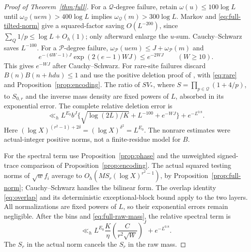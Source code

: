\documentclass[11pt]{article}
\theoremstyle{definition}
\newcommand{\Pset}{\mathcal P}
\theoremstyle{remark}
\numberwithin{equation}{section}
\newcommand{\Qset}{\mathcal Q}
\begin{document}
\begin{proof}[Proof of Theorem~\ref{thm:full}]
For a $\Qset$-degree failure, retain $\omega(u)\le100\log L$ until
$\omega_{\Qset}(uem)>400\log L$ implies $\omega_{\Qset}(m)>300\log L$.
Markov and \eqref{eq:full-tilted-norm} give a squared-factor saving $O(L^{-200})$, since
$\sum_Q1/p\le\log L+O_h(1)$; only afterward enlarge the $u$-sum.
Cauchy--Schwarz saves $L^{-100}$.
For a $\Pset$-degree failure, $\omega_{\Pset}(uem)\le J+\omega_{\Pset}(m)$ and
\begin{equation}\label{eq:full-p-tail}
 e^{-(6W-1)J}\exp(2(e-1)WJ)\le e^{-2WJ}\qquad(W\ge10).
\end{equation}
This gives $e^{-WJ}$ after Cauchy--Schwarz.
For rare-site failures discard $B(n)B(n+hdu)\le1$ and use the positive deletion proof of
\cite[Lemma~4.6, pp.~19--20]{OpenAI007}, with \eqref{eq:rare} and Proposition~\ref{prop:encoding}.
The ratio of $SV_*$, where $S=\prod_{p\in\Qset}(1+4/p)$, to $S_{0,r}$ and the inverse mass density are fixed powers of $L$, absorbed in its
exponential error. The complete relative deletion error is
\begin{equation}\label{eq:full-deletion-budget}
 \ll_h L^{E_0}b^J\{\sqrt{\log(2L)/K}+L^{-100}+e^{-WJ}\}+e^{-L^{0.8}}.
\end{equation}
Here $(\log X)^{(r^2-1)+2\delta}=(\log X)^{\delta^2}=L^{E_0}$.
The nonrare estimates were actual-integer positive norms, not a finite-residue model for $B$.

For the spectral term use Proposition~\ref{prop:phase} and the unweighted signed-trace comparison of
Proposition~\ref{prop:encoding}.
The actual squared testing norms of $\sqrt w f_i$ average to
$O_h(MS_r(\log X)^{r^2-1})$, by Proposition~\ref{prop:full-norm}; Cauchy--Schwarz handles the bilinear form.
The overlap identity \eqref{eq:overlap} and its deterministic exceptional-block bound apply to the two layers.
All normalizations are fixed powers of $L$, so their exponential errors remain negligible.
After the bins and \eqref{eq:full-raw-mass}, the relative spectral term is
\begin{equation}\label{eq:full-spectral}
 \ll_h L^{E_0}\frac K\eta\left(\frac C{r^2\sqrt W}\right)^J+e^{-L^{0.8}}.
\end{equation}
The $S_r$ in the actual norm cancels the $S_r$ in the raw mass.


\end{proof}
\end{document}
